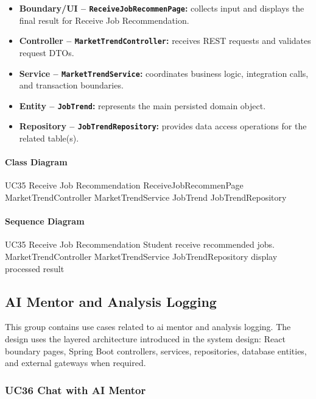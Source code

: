 \begin{itemize}
    \item \textbf{Boundary/UI -- \texttt{ReceiveJobRecommenPage}:} collects input and displays the final result for Receive Job Recommendation.
    \item \textbf{Controller -- \texttt{MarketTrendController}:} receives REST requests and validates request DTOs.
    \item \textbf{Service -- \texttt{MarketTrendService}:} coordinates business logic, integration calls, and transaction boundaries.
    \item \textbf{Entity -- \texttt{JobTrend}:} represents the main persisted domain object.
    \item \textbf{Repository -- \texttt{JobTrendRepository}:} provides data access operations for the related table(s).
\end{itemize}

\paragraph{Class Diagram}

\ClassDiagram
{UC35 Receive Job Recommendation}
{ReceiveJobRecommenPage}
{MarketTrendController}
{MarketTrendService}
{JobTrend}
{JobTrendRepository}

\paragraph{Sequence Diagram}

\SequenceDiagram
{UC35 Receive Job Recommendation}
{Student}
{receive recommended jobs.}
{MarketTrendController}
{MarketTrendService}
{JobTrendRepository}
{display processed result}

\subsection{AI Mentor and Analysis Logging}

This group contains use cases related to ai mentor and analysis logging. The design uses the layered architecture introduced in the system design: React boundary pages, Spring Boot controllers, services, repositories, database entities, and external gateways when required.

\subsubsection{UC36 Chat with AI Mentor}

